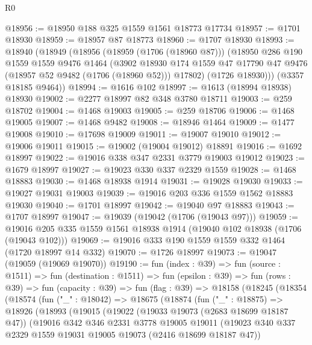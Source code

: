 \begin{lexlean}{R0}
\begin{coremodule}
@18956 := @18950 @188 @325 @1559 @1561 @18773 @17734
@18957 := @1701 @18930
@18959 := @18957 @87 @18773
@18960 := @1707 @18930
@18993 := @18940
    (@18949
      (@18956
        (@18959 (@1706 (@18960 @87)))
        (@18950
          @286
          @190
          @1559
          @1559
          @9476
          @1464
          (@3902
            @18930
            @174
            @1559
            @47
            @17790
            @47
            @9476
            (@18957 @52 @9482 (@1706 (@18960 @52)))
            @17802)
          (@1726 @18930)))
      (@3357 @18185 @9464))
@18994 := @1616 @102
@18997 := @1613 (@18994 @18938) @18930
@19002 := @2277 @18997 @82 @348 @3780 @18711
@19003 := @259 @18702
@19004 := @1468 @19003
@19005 := @259 @18706
@19006 := @1468 @19005
@19007 := @1468 @9482
@19008 := @18946 @1464
@19009 := @1477 @19008
@19010 := @17698 @19009
@19011 := @19007 @19010
@19012 := @19006 @19011
@19015 := @19002 (@19004 @19012) @18891
@19016 := @1692 @18997
@19022 := @19016 @338 @347 @2331 @3779 @19003 @19012
@19023 := @1679 @18997
@19027 := @19023 @330 @337 @2329 @1559
@19028 := @1468 @18883
@19030 := @1468 @18938 @1914
@19031 := @19028 @19030
@19033 := @19027 @19031 @19003
@19039 := @19016 @203 @336 @1559 @1562 @18883 @19030
@19040 := @1701 @18997
@19042 := @19040 @97 @18883
@19043 := @1707 @18997
@19047 := @19039 (@19042 (@1706 (@19043 @97)))
@19059 := @19016 @205 @335 @1559 @1561 @18938 @1914 (@19040 @102 @18938 (@1706 (@19043 @102)))
@19069 := @19016 @333 @190 @1559 @1559 @332 @1464 (@1720 @18997 @14 @332)
@19070 := @1726 @18997
@19073 := @19047 (@19059 (@19069 @19070))
@19190 := fun (index : @39) =>
  fun (source : @1511) =>
  fun (destination : @1511) =>
  fun (epsilon : @39) =>
  fun (rows : @39) =>
  fun (capacity : @39) =>
  fun (flag : @39) =>
  @18158
    (@18245
      (@18354
        (@18574
          (fun ("_" : @18042) =>
          @18675
            (@18874
              (fun ("_" : @18875) =>
              @18926
                (@18993
                  (@19015
                    (@19022
                      (@19033 @19073 (@2683 @18699 @18187 @47))
                      (@19016
                        @342
                        @346
                        @2331
                        @3778
                        @19005
                        @19011
                        (@19023
                          @340
                          @337
                          @2329
                          @1559
                          @19031
                          @19005
                          @19073
                          (@2416 @18699 @18187 @47))

\end{coremodule}
\end{lexlean}
